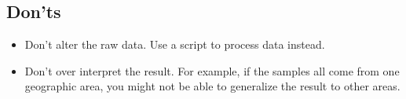 \documentclass[
]{book}
\providecommand{\tightlist}{%
  \setlength{\itemsep}{0pt}\setlength{\parskip}{0pt}}
\begin{document}
\hypertarget{donts}{%
\subsection{Don'ts}\label{donts}}

\begin{itemize}
\tightlist
\item
  Don't alter the raw data. Use a script to process data instead.
\item
  Don't over interpret the result. For example, if the samples all come from one geographic area, you might not be able to generalize the result to other areas.
\end{itemize}

  
\end{document}
